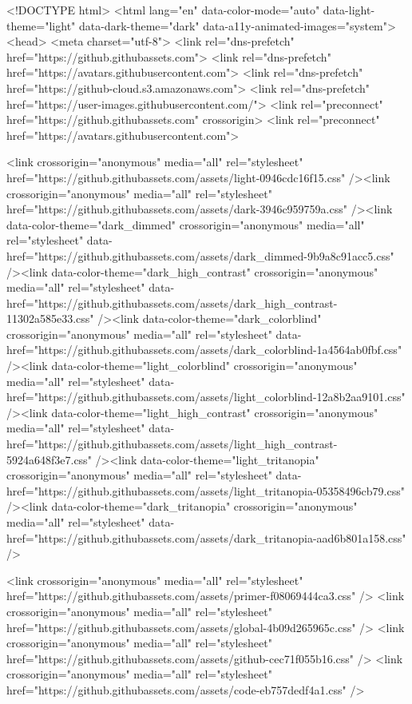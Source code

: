 






<!DOCTYPE html>
<html lang="en" data-color-mode="auto" data-light-theme="light" data-dark-theme="dark" data-a11y-animated-images="system">
  <head>
    <meta charset="utf-8">
  <link rel="dns-prefetch" href="https://github.githubassets.com">
  <link rel="dns-prefetch" href="https://avatars.githubusercontent.com">
  <link rel="dns-prefetch" href="https://github-cloud.s3.amazonaws.com">
  <link rel="dns-prefetch" href="https://user-images.githubusercontent.com/">
  <link rel="preconnect" href="https://github.githubassets.com" crossorigin>
  <link rel="preconnect" href="https://avatars.githubusercontent.com">

  <link crossorigin="anonymous" media="all" rel="stylesheet" href="https://github.githubassets.com/assets/light-0946cdc16f15.css" /><link crossorigin="anonymous" media="all" rel="stylesheet" href="https://github.githubassets.com/assets/dark-3946c959759a.css" /><link data-color-theme="dark_dimmed" crossorigin="anonymous" media="all" rel="stylesheet" data-href="https://github.githubassets.com/assets/dark_dimmed-9b9a8c91acc5.css" /><link data-color-theme="dark_high_contrast" crossorigin="anonymous" media="all" rel="stylesheet" data-href="https://github.githubassets.com/assets/dark_high_contrast-11302a585e33.css" /><link data-color-theme="dark_colorblind" crossorigin="anonymous" media="all" rel="stylesheet" data-href="https://github.githubassets.com/assets/dark_colorblind-1a4564ab0fbf.css" /><link data-color-theme="light_colorblind" crossorigin="anonymous" media="all" rel="stylesheet" data-href="https://github.githubassets.com/assets/light_colorblind-12a8b2aa9101.css" /><link data-color-theme="light_high_contrast" crossorigin="anonymous" media="all" rel="stylesheet" data-href="https://github.githubassets.com/assets/light_high_contrast-5924a648f3e7.css" /><link data-color-theme="light_tritanopia" crossorigin="anonymous" media="all" rel="stylesheet" data-href="https://github.githubassets.com/assets/light_tritanopia-05358496cb79.css" /><link data-color-theme="dark_tritanopia" crossorigin="anonymous" media="all" rel="stylesheet" data-href="https://github.githubassets.com/assets/dark_tritanopia-aad6b801a158.css" />
  
  
    <link crossorigin="anonymous" media="all" rel="stylesheet" href="https://github.githubassets.com/assets/primer-f08069444ca3.css" />
    <link crossorigin="anonymous" media="all" rel="stylesheet" href="https://github.githubassets.com/assets/global-4b09d265965c.css" />
    <link crossorigin="anonymous" media="all" rel="stylesheet" href="https://github.githubassets.com/assets/github-cec71f055b16.css" />
  <link crossorigin="anonymous" media="all" rel="stylesheet" href="https://github.githubassets.com/assets/code-eb757dedf4a1.css" />

